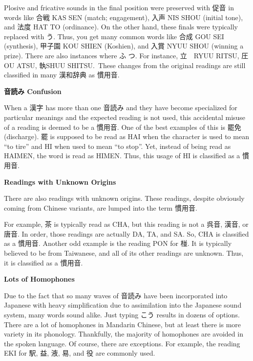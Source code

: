 \par{ Plosive and fricative sounds in the final position were preserved with 促音 in words like 合戦 KAS SEN (match; engagement), 入声 NIS SHOU (initial tone), and 法度 HAT TO (ordinance). On the other hand, these finals were typically replaced with う. Thus, you get many common words like 合成 GOU SEI (synthesis), 甲子園 KOU SHIEN (Koshien), and 入賞 NYUU SHOU (winning a prize). There are also instances where ふ \textrightarrow  つ. For instance, 立　RYUU \textrightarrow  RITSU, 圧 OU \textrightarrow  ATSU, 執SHUU \textrightarrow  SHITSU. These changes from the original readings are still classified in many 漢和辞典 as 慣用音. }

\par{\textbf{音読み Confusion }}

\par{ When a 漢字 has more than one 音読み and they have become specialized for particular meanings and the expected reading is not used, this accidental misuse of a reading is deemed to be a 慣用音. One of the best examples of this is 罷免 (discharge). 罷 is supposed to be read as HAI when the character is used to mean “to tire” and HI when used to mean “to stop”. Yet, instead of being read as HAIMEN, the word is read as HIMEN. Thus, this usage of HI is classified as a 慣用音. }

\par{\textbf{Readings with Unknown Origins }}

\par{ There are also readings with unknown origins. These readings, despite obviously coming from Chinese variants, are lumped into the term 慣用音. }

\par{ For example, 茶 is typically read as CHA, but this reading is not a 呉音, 漢音, or 唐音. In order, those readings are actually DA, TA, and SA. So, CHA is classified as a 慣用音. Another odd example is the reading PON for 椪. It is typically believed to be from Taiwanese, and all of its other readings are unknown. Thus, it is classified as a 慣用音. }

\par{\textbf{Lots of Homophones } }

\par{ Due to the fact that so many waves of 音読み have been incorporated into Japanese with heavy simplification due to assimilation into the Japanese sound system, many words sound alike. Just typing こう results in dozens of options. There are a lot of homophones in Mandarin Chinese, but at least there is more variety in its phonology. Thankfully, the majority of homophones are avoided in the spoken language. Of course, there are exceptions. For example, the reading EKI for 駅, 益, 液, 易, and 役 are commonly used. }
      

